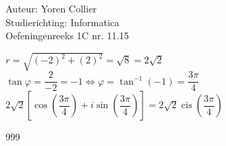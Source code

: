 \documentclass[a4paper]{article}
\newcommand{\asa}{\Leftrightarrow}
\newcommand{\Lh}{\left(}
\newcommand{\Rh}{\right)}
\newcommand{\Lv}{\left[}
\newcommand{\Rv}{\right]}
\begin{document}
\noindent \large Auteur: Yoren Collier \\
\noindent \large Studierichting: Informatica\\
\noindent \large Oefeningenreeks 1C nr. 11.15\\

\medskip

\normalsize

$r = \sqrt{\Lh-2\Rh^{2} + \Lh2\Rh^{2}} = \sqrt{8} = 2\sqrt{2}$\\

$\tan  \varphi = \dfrac{2}{-2} = -1 \asa \varphi = \tan^{-1} \Lh-1\Rh = \dfrac{3\pi}{4}$\\

$2\sqrt{2}\Lv\cos \Lh\dfrac{3\pi}{4}\Rh + i \sin \Lh\dfrac{3\pi}{4}\Rh\Rv = 2\sqrt{2} \operatorname{cis}\Lh\dfrac{3\pi}{4}\Rh$\\

\begin{thebibliography}{999}
\end{thebibliography}
\end{document}

